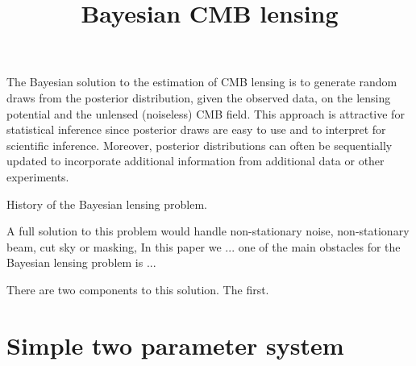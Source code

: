 \documentclass[11pt]{article}
\title{Bayesian CMB lensing}
\date{}
\begin{document}
\maketitle

The Bayesian solution to the estimation of CMB lensing  is to generate random draws from the posterior distribution, given the observed data, on the lensing potential and the unlensed (noiseless) CMB field. This approach is attractive for statistical inference since posterior draws are easy to use and to interpret for scientific inference. Moreover, posterior distributions can often be sequentially updated to incorporate additional information from additional data or other experiments.

History of the Bayesian lensing problem.

A full solution to this problem would handle non-stationary noise, non-stationary beam, cut sky or masking, In this paper we ... one of the main obstacles for the Bayesian lensing problem is ...

There are two components to this solution. The first.

%
%
\section{Simple two parameter system}
\label{two parameter system}
\end{document}
